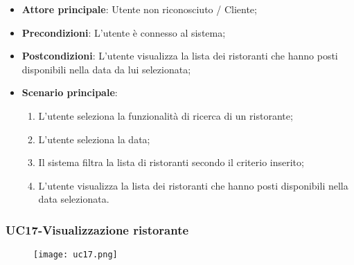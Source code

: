 \begin{itemize}
\item \textbf{Attore principale}: Utente non riconosciuto / Cliente;
\item \textbf{Precondizioni}: L'utente è connesso al sistema;
\item \textbf{Postcondizioni}: L'utente visualizza la lista dei ristoranti che hanno posti disponibili nella data da lui selezionata;
\item \textbf{Scenario principale}:
\begin{enumerate}
\item L'utente seleziona la funzionalità di ricerca di un ristorante;
\item L'utente seleziona la data;
\item Il sistema filtra la lista di ristoranti secondo il criterio inserito;
\item L'utente visualizza la lista dei ristoranti che hanno posti disponibili nella data selezionata.
\end{enumerate}
\end{itemize}

\pagebreak
\subsubsection{UC17-Visualizzazione ristorante}
\begin{figure}[h] \texttt{[image: uc17.png]} \end{figure}

